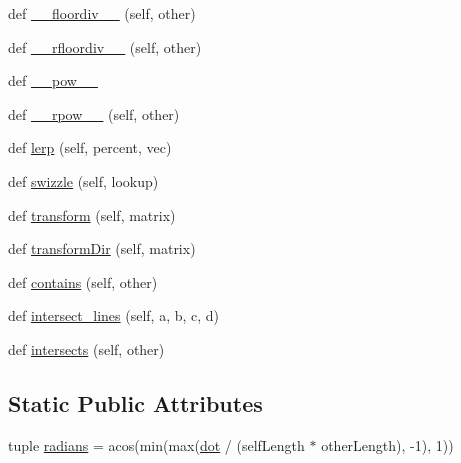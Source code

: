 \begin{DoxyCompactItemize}
def \hyperlink{classminivec_1_1minivec_1_1_vec_aed509a7f6cf9612ef4340a8007be802e}{\+\_\+\+\_\+floordiv\+\_\+\+\_\+} (self, other)
\item 
def \hyperlink{classminivec_1_1minivec_1_1_vec_ac8994c91d9d51f598a843bea33c0c903}{\+\_\+\+\_\+rfloordiv\+\_\+\+\_\+} (self, other)
\item 
def \hyperlink{classminivec_1_1minivec_1_1_vec_a874e050c750a9247db2d4888ec786738}{\+\_\+\+\_\+pow\+\_\+\+\_\+}
\item 
def \hyperlink{classminivec_1_1minivec_1_1_vec_a67e96d808a604a6b097c5f7e948936da}{\+\_\+\+\_\+rpow\+\_\+\+\_\+} (self, other)
\item 
def \hyperlink{classminivec_1_1minivec_1_1_vec_a574d9ffdbb0882b8eeffb1de2349c400}{lerp} (self, percent, vec)
\item 
def \hyperlink{classminivec_1_1minivec_1_1_vec_a739a2e0dc01ccf7933e7d3049db2df6b}{swizzle} (self, lookup)
\item 
def \hyperlink{classminivec_1_1minivec_1_1_vec_a0c738e1b2b652117221c7c65b1f86ed6}{transform} (self, matrix)
\item 
def \hyperlink{classminivec_1_1minivec_1_1_vec_afed5a575947602d4465c575c9a7cb487}{transform\+Dir} (self, matrix)
\item 
def \hyperlink{classminivec_1_1minivec_1_1_vec_a900f4777f70b5890dd3d00f0d03c3ae6}{contains} (self, other)
\item 
def \hyperlink{classminivec_1_1minivec_1_1_vec_ac982df914bb9c39e4d047394038f8d23}{intersect\+\_\+lines} (self, a, b, c, d)
\item 
def \hyperlink{classminivec_1_1minivec_1_1_vec_a0f5fa85fedf86c37d86dc831048110ff}{intersects} (self, other)
\end{DoxyCompactItemize}
\subsection*{Static Public Attributes}
\begin{DoxyCompactItemize}
\item 
tuple \hyperlink{classminivec_1_1minivec_1_1_vec_ac08a2b6165dcf25f73dc8c87fd981a1f}{radians} = acos(min(max(\hyperlink{classminivec_1_1minivec_1_1_vec_a026c12dff843c6a2dda345baf6a11bc6}{dot} / (self\+Length $\ast$ other\+Length), -\/1), 1))
\end{DoxyCompactItemize}


